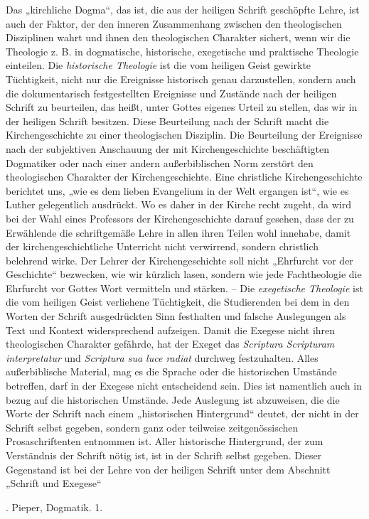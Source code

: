  \hfill {}

Das „kirchliche Dogma“, das ist, die aus der heiligen Schrift
geschöpfte Lehre, ist auch der Faktor, der den inneren Zusam\-menhang
zwischen den theologischen Disziplinen wahrt und ihnen
den theologischen Charakter sichert, wenn wir die Theologie z. B. in
dogmatische, historische, exegetische und praktische Theologie einteilen.
Die \emph{historische Theologie} ist die vom heiligen Geist gewirkte
Tüchtigkeit, nicht nur die Ereignisse historisch genau darzustellen, son\-dern
auch die dokumentarisch festgestellten Ereignisse und Zustände nach
der heiligen Schrift zu beurteilen, das heißt, unter Gottes eigenes
Urteil zu stellen, das wir in der heiligen Schrift besitzen. Diese
Beurteilung nach der Schrift macht die Kirchengeschichte zu einer
theologischen Disziplin. Die Beurteilung der Ereignisse nach
der subjektiven Anschauung der mit Kirchengeschichte beschäftig\-ten
Dogmatiker oder nach einer andern außerbiblischen Norm
zerstört den theologischen Charakter der Kirchengeschichte. Eine christ\-liche
Kirchengeschichte berichtet uns, „wie es dem lieben Evangelium
in der Welt ergangen ist“, wie es Luther gelegentlich ausdrückt. Wo
es daher in der Kirche recht zugeht, da wird bei der Wahl eines Pro\-fessors
der Kirchengeschichte darauf gesehen, dass der zu Erwählende
die schriftgemäße Lehre in allen ihren Teilen wohl innehabe, damit
der kirchengeschichtliche Unterricht nicht verwirrend, sondern christlich
belehrend wirke. Der Lehrer der Kirchengeschichte soll nicht „Ehr\-furcht
vor der Geschichte“ bezwecken, wie wir kürzlich lasen, son\-dern
wie jede Fachtheologie die Ehrfurcht vor Gottes Wort ver\-mitteln
und stärken. – Die \emph{exegetische Theologie} ist die vom
heiligen Geist verliehene Tüchtigkeit, die Studierenden bei dem in
den Worten der Schrift ausgedrückten Sinn festhalten und falsche Aus\-legungen
als Text und Kontext widersprechend aufzeigen. Damit
die Exegese nicht ihren theologischen Charakter gefährde, hat der
Exeget das \emph{Scriptura Scripturam interpretatur} und \emph{Scriptura sua
luce radiat} durchweg festzuhalten. Alles außerbiblische Material,
mag es die Sprache oder die historischen Umstände betreffen, darf in
der Exegese nicht entscheidend sein. Dies ist namentlich auch
in bezug auf die historischen Umstände. Jede Auslegung ist abzu\-weisen,
die die Worte der Schrift nach einem „historischen Hinter\-grund“
deutet, der nicht in der Schrift selbst gegeben, sondern ganz
oder teilweise zeitgenössischen Prosaschriftenten entnommen ist. Aller
historische Hintergrund, der zum Verständnis der Schrift nötig ist, ist
in der Schrift selbst gegeben. Dieser Gegenstand ist bei der Lehre
von der heiligen Schrift unter dem Abschnitt „Schrift und Exegese“

. Pieper, Dogmatik. 1.

